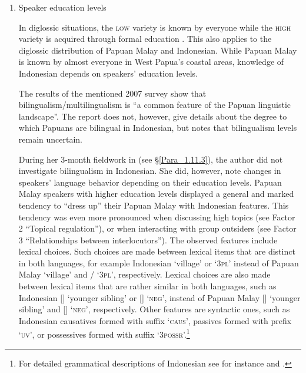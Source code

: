 \begin{enumerate}

\item Speaker education levels\label{Item_1.1}

In diglossic situations, the \textsc{low} variety is known by everyone while the \textsc{high} variety is acquired through formal education \citep{Ferguson.1972}. This also applies to the diglossic distribution of Papuan Malay and Indonesian. While Papuan Malay is known by almost everyone in West Papua’s coastal areas, knowledge of Indonesian depends on speakers’ education levels.

The results of the mentioned 2007 survey \citep[14–17]{Scott.2008} show that bilingualism/multilingualism is  ``a common feature of the Papuan linguistic landscape''. The report does not, however, give details about the degree to which Papuans are bilingual in Indonesian, but notes that bilingualism levels remain uncertain.

During her 3-month fieldwork in  (see §\ref{Para_1.11.3}), the author did not investigate bilingualism in Indonesian. She did, however, note changes in speakers’ language behavior depending on their education levels. Papuan Malay speakers with higher education levels displayed a general and marked tendency to  ``dress up'' their Papuan Malay with Indonesian features. This tendency was even more pronounced when discussing high topics (see Factor 2 ``Topical regulation''), or when interacting with group outsiders (see Factor 3 ``Relationships between interlocutors''). The observed features include lexical choices. Such choices are made between lexical items that are distinct in both languages, for example Indonesian  ‘village’ or  ‘\textsc{3pl}’ instead of Papuan Malay  ‘village’ and / ‘\textsc{3pl}’, respectively. Lexical choices are also made between lexical items that are rather similar in both languages, such as Indonesian  [] ‘younger sibling’ or  [] ‘\textsc{neg}’, instead of Papuan Malay  [] ‘younger sibling’ and  [] ‘\textsc{neg}’, respectively. Other features are syntactic ones, such as Indonesian causatives formed with suffix  ‘\textsc{caus}’, passives formed with prefix  ‘\textsc{uv}’, or possessives formed with suffix  ‘\textsc{3possr}’.\footnote{For detailed grammatical descriptions of Indonesian see for instance {\citet{Mintz.1994}} and {\citet{Sneddon.2010}}.}


\end{enumerate}

